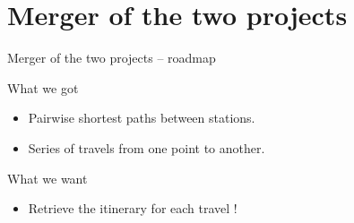 \section{Merger of the two projects}

\begin{frame}{Merger of the two projects -- roadmap}
	\begin{block}{What we got}
		\begin{itemize}
			\item Pairwise shortest paths between stations.
			\item Series of travels from one point to another.
		\end{itemize}
	\end{block}
	\begin{alertblock}{What we want}
		\begin{itemize}
			\item Retrieve the itinerary for each travel !
		\end{itemize}
	\end{alertblock}
\end{frame}


